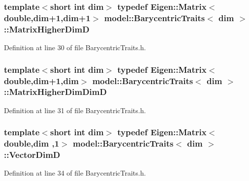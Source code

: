 \subsubsection[{Matrix\+Higher\+Dim\+D}]{\setlength{\rightskip}{0pt plus 5cm}template$<$short int dim$>$ typedef Eigen\+::\+Matrix$<$double,{\bf dim}+1,{\bf dim}+1$>$ {\bf model\+::\+Barycentric\+Traits}$<$ {\bf dim} $>$\+::{\bf Matrix\+Higher\+Dim\+D}}\label{structmodel_1_1_barycentric_traits_a90e0d5eb84d856af28e250bbb11f2ced}


Definition at line 30 of file Barycentric\+Traits.\+h.

\hypertarget{structmodel_1_1_barycentric_traits_afe45a5057be0ecbe991df26efe84ce2e}{}
\subsubsection[{Matrix\+Higher\+Dim\+Dim\+D}]{\setlength{\rightskip}{0pt plus 5cm}template$<$short int dim$>$ typedef Eigen\+::\+Matrix$<$double,{\bf dim}+1,{\bf dim}$>$ {\bf model\+::\+Barycentric\+Traits}$<$ {\bf dim} $>$\+::{\bf Matrix\+Higher\+Dim\+Dim\+D}}\label{structmodel_1_1_barycentric_traits_afe45a5057be0ecbe991df26efe84ce2e}


Definition at line 31 of file Barycentric\+Traits.\+h.

\hypertarget{structmodel_1_1_barycentric_traits_a05149349d869b7dfa9c40be51dce1472}{}
\subsubsection[{Vector\+Dim\+D}]{\setlength{\rightskip}{0pt plus 5cm}template$<$short int dim$>$ typedef Eigen\+::\+Matrix$<$double,{\bf dim} ,1$>$ {\bf model\+::\+Barycentric\+Traits}$<$ {\bf dim} $>$\+::{\bf Vector\+Dim\+D}}\label{structmodel_1_1_barycentric_traits_a05149349d869b7dfa9c40be51dce1472}


Definition at line 34 of file Barycentric\+Traits.\+h.

\hypertarget{structmodel_1_1_barycentric_traits_acf017f73aa445c84be0b91d5cdf3d5de}{}
